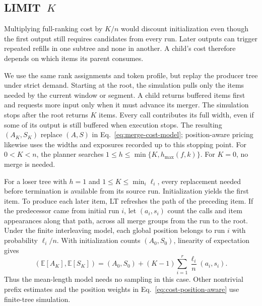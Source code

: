 \subsection{\texorpdfstring{\textsf{LIMIT}~$K$}{LIMIT K}}
\label{sec:cost-limit}

Multiplying full-ranking cost by $K/n$ would discount initialization even though the first output still requires candidates from every run. Later outputs can trigger repeated refills in one subtree and none in another. A child's cost therefore depends on which items its parent consumes.

We use the same rank assignments and token profile, but replay the producer tree under strict demand. Starting at the root, the simulation pulls only the items needed by the current window or segment. A child returns buffered items first and requests more input only when it must advance its merger. The simulation stops after the root returns $K$ items. Every call contributes its full width, even if some of its output is still buffered when execution stops. The resulting $(A_K,S_K)$ replace $(A,S)$ in Eq.~\eqref{eq:merge-cost-model}; position-aware pricing likewise uses the widths and exposures recorded up to this stopping point. For $0<K<n$, the planner searches $1\leq h\leq\min\{K,h_{\max}(f,k)\}$. For $K=0$, no merge is needed.

For a loser tree with $h=1$ and $1\leq K\leq\min_i\ell_i$, every replacement needed before termination is available from its source run. Initialization yields the first item. To produce each later item, LT refreshes the path of the preceding item. If the predecessor came from initial run $i$, let $(a_i,s_i)$ count the calls and item appearances along that path, across all merge groups from the run to the root. Under the finite interleaving model, each global position belongs to run $i$ with probability $\ell_i/n$. With initialization counts $(A_0,S_0)$, linearity of expectation gives
\begin{equation}
 (\mathbb E[A_K],\mathbb E[S_K])=(A_0,S_0)
  +(K-1)\sum_{i=1}^{r}\frac{\ell_i}{n}(a_i,s_i).
 \label{eq:cost-limit-single}
\end{equation}
Thus the mean-length model needs no sampling in this case. Other nontrivial prefix estimates and the position weights in Eq.~\eqref{eq:cost-position-aware} use finite-tree simulation.
